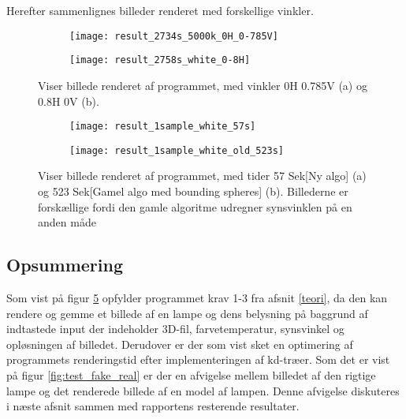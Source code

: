 Herefter sammenlignes billeder renderet med forskellige vinkler.
\begin{figure}[H]
\centering
\begin{subfigure}{.5\textwidth}
  \centering
  \texttt{[image: result\_2734s\_5000k\_0H\_0-785V]}
  \caption{}
  \label{fig:real}
\end{subfigure}%
\begin{subfigure}{.5\textwidth}
  \centering
  \texttt{[image: result\_2758s\_white\_0-8H]}
  \caption{}
  \label{fig:fake}
\end{subfigure}
\caption{Viser billede renderet af programmet, med vinkler 0H 0.785V (a) og 0.8H 0V (b).}
\label{fig:synsvinkel1}
\end{figure}

\begin{figure}[H]
\centering
\begin{subfigure}{.5\textwidth}
  \centering
  \texttt{[image: result\_1sample\_white\_57s]}
  \caption{}
  \label{fig:real}
\end{subfigure}%
\begin{subfigure}{.5\textwidth}
  \centering
  \texttt{[image: result\_1sample\_white\_old\_523s]}
  \caption{}
  \label{fig:fake}
\end{subfigure}
\caption{Viser billede renderet af programmet, med tider 57 Sek[Ny algo] (a) og 523 Sek[Gamel algo med bounding spheres] (b). Billederne er forskællige fordi den gamle algoritme udregner synsvinklen på en anden måde}
\label{fig:synsvinkel1}
\end{figure}

\subsection*{Opsummering}
Som vist på figur \ref{fig:fake} opfylder programmet krav 1-3 fra afsnit \ref{teori}, da den kan rendere og gemme et billede af en lampe og dens belysning på baggrund af indtastede input der indeholder 3D-fil, farvetemperatur, synsvinkel og opløsningen af billedet. Derudover er der som vist sket en optimering af programmets renderingstid efter implementeringen af kd-træer. 
Som det er vist på figur \ref{fig:test_fake_real} er der en afvigelse mellem billedet af den rigtige lampe og det renderede billede af en model af lampen. Denne afvigelse diskuteres i næste afsnit sammen med rapportens resterende resultater. 

